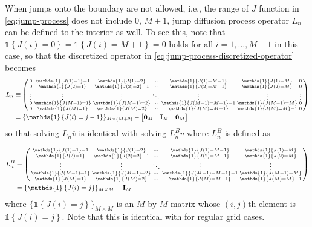 \documentclass[11pt]{article}
\newcommand{\indicator}[1]{\ensuremath{\mathds{1}\left\{{#1}\right\}}}
\newenvironment{psmallmatrix}
{\left(\begin{smallmatrix}}
	{\end{smallmatrix}\right)}
\theoremstyle{definition}
\begin{document}
When jumps onto the boundary are not allowed, i.e., the range of $J$ function in \eqref{eq:jump-process} does not include $0$, $M+1$,  jump diffusion process operator $L_n$ can be defined to the interior as well. To see this, note that $\indicator{J(i) = 0} = \indicator{J(i) = M+1} = 0$ holds for all $i = 1,..., M+1$ in this case, so that the discretized operator in \eqref{eq:jump-process-discretized-operator} becomes
\begin{align}
L_n &\equiv \begin{psmallmatrix}
0 & \indicator{J(1) = 1} -1 & \indicator{J(1) = 2} & \cdots & \indicator{J(1) = M-1} & \indicator{J(1) = M} & 0 \\
0 & \indicator{J(2) = 1}  & \indicator{J(2) = 2} - 1 & \cdots & \indicator{J(2) = M-1}  & \indicator{J(2) = M} & 0 \\
\vdots & \vdots & \vdots & \ddots & \vdots & \vdots &\vdots \\
0 & \indicator{J(M-1) = 1}  & \indicator{J(M-1) = 2} & \cdots & \indicator{J(M-1) = M-1} - 1 & \indicator{J(M-1) = M} &0 \\
0 & \indicator{J(M) = 1}  & \indicator{J(M) = 2} & \cdots & \indicator{J(M) = M-1}  & \indicator{J(M) = M} - 1&0
\end{psmallmatrix}
\\
&= \{ \indicator{ J(i) = j-1 } \}_{M \times (M+2)} - \begin{bmatrix} \mathbf{0}_M &\mathbf{I}_M & \mathbf{0}_M  \end{bmatrix}
\end{align}
so that solving $L_n \overline{v} $ is identical with solving $L_n^B v$ where $L_n^B$ is defined as

\begin{align}
L_n^B &\equiv \begin{psmallmatrix}
\indicator{J(1) = 1} -1 & \indicator{J(1) = 2} & \cdots & \indicator{J(1) = M-1} & \indicator{J(1) = M}  \\
\indicator{J(2) = 1}  & \indicator{J(2) = 2} - 1 & \cdots & \indicator{J(2) = M-1}  & \indicator{J(2) = M}  \\
\vdots & \vdots & \ddots & \vdots & \vdots \\
\indicator{J(M-1) = 1}  & \indicator{J(M-1) = 2} & \cdots & \indicator{J(M-1) = M-1} - 1 & \indicator{J(M-1) = M}  \\
\indicator{J(M) = 1}  & \indicator{J(M) = 2} & \cdots & \indicator{J(M) = M-1}  & \indicator{J(M) = M} - 1
\end{psmallmatrix}
\\
&= \{ \indicator{ J(i) = j } \}_{M \times M} - \mathbf{I}_M 
\end{align}
where $\{ \indicator{ J(i) = j } \}_{M \times M} $ is an $M$ by $M$ matrix whose $(i,j)$th element is $ \indicator{ J(i) = j } $. Note that this is identical with \label{eq:jump-process-discretized-operator-interior} for regular grid cases.
\end{document}
